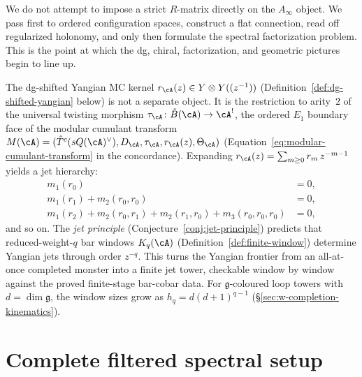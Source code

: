 We do not attempt to impose a strict $R$-matrix directly on the
$A_\infty$ object.  We pass first to ordered configuration spaces,
construct a flat connection, read off regularized holonomy, and only
then formulate the spectral factorization problem.  This is the point
at which the dg, chiral, factorization, and geometric pictures begin to
line up.

\begin{remark}
\label{rem:yangian-ordered-boundary-face}
The dg-shifted Yangian MC kernel $r_\cA(z) \in Y \otimes Y((z^{-1}))$
(Definition~\ref{def:dg-shifted-yangian} below) is not a
separate object.  It is the restriction to arity~$2$ of the
universal twisting morphism
$\tau_\cA\colon \hat{B}(\cA) \to \cA^!$, the ordered $E_1$
boundary face of the modular cumulant transform
$M(\cA) = (\hat{T}^c(sQ(\cA)^\vee), D_\cA, \tau_\cA,
r_\cA(z), \Theta_\cA)$
(Equation~\eqref{eq:modular-cumulant-transform} in the
concordance).  Expanding $r_\cA(z) = \sum_{m \geq 0}
r_m\, z^{-m-1}$ yields a jet hierarchy:
\begin{align*}
m_1(r_0) &= 0, \\
m_1(r_1) + m_2(r_0, r_0) &= 0, \\
m_1(r_2) + m_2(r_0, r_1) + m_2(r_1, r_0) + m_3(r_0, r_0, r_0) &= 0,
\end{align*}
and so on.  The \emph{jet principle}
(Conjecture~\ref{conj:jet-principle}) predicts that
reduced-weight-$q$ bar windows $K_q(\cA)$
(Definition~\ref{def:finite-window}) determine Yangian jets
through order $z^{-q}$.  This turns the Yangian frontier from an
all-at-once completed monster into a finite jet tower, checkable
window by window against the proved finite-stage bar-cobar data.
For $\mathfrak{g}$-coloured loop towers with $d = \dim\mathfrak{g}$,
the window sizes grow as $h_q = d(d+1)^{q-1}$
(\S\ref{sec:w-completion-kinematics}).
\end{remark}

\section{Complete filtered spectral setup}

